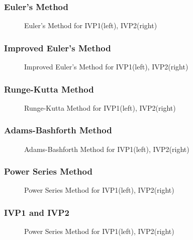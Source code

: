 \documentclass[UTF8]{beamer}
\begin{document}

\begin{frame}
\frametitle{Euler's Method}
	\begin{figure}
		\centering
		\scalebox{0.45}{}
		\caption{Euler's Method for IVP1(left), IVP2(right)}
	\end{figure}
\end{frame}	

\begin{frame}
	\frametitle{Improved Euler's Method}
	\begin{figure}
		\centering
		\scalebox{0.45}{}
		\caption{Improved Euler's Method for IVP1(left), IVP2(right)}
	\end{figure}
\end{frame}	

\begin{frame}
	\frametitle{Runge-Kutta Method}
	\begin{figure}
		\centering
		\scalebox{0.45}{}
		\caption{Runge-Kutta Method for IVP1(left), IVP2(right)}
	\end{figure}
\end{frame}

\begin{frame}
	\frametitle{Adams-Bashforth Method}
	\begin{figure}
		\centering
		\scalebox{0.45}{}
		\caption{Adams-Bashforth Method for IVP1(left), IVP2(right)}
	\end{figure}
\end{frame}
\begin{frame}
	\frametitle{Power Series Method}
	\begin{figure}
		\centering
		\scalebox{0.45}{}
		\caption{Power Series Method for IVP1(left), IVP2(right)}
	\end{figure}
\end{frame}
\begin{frame}[allowframebreaks]
	\frametitle{IVP1 and IVP2}
	\begin{figure}
		\centering
		\scalebox{0.45}{}
		\caption{Power Series Method for IVP1(left), IVP2(right)}
	\end{figure}
\end{frame}
\end{document}
